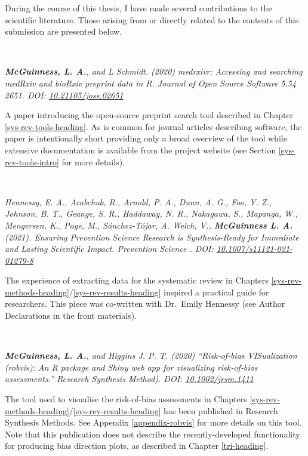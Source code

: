 \documentclass[a4paper, twoside]{templates/ociamthesis}
\begin{document}
During the course of this thesis, I have made several contributions to the scientific literature. Those arising from or directly related to the contents of this submission are presented below.

~

\emph{\textbf{McGuinness, L. A.}, and L Schmidt. (2020) medrxivr: Accessing and searching medRxiv and bioRxiv preprint data in R. Journal of Open Source Software 5.54 2651. DOI: \href{https://doi.org/10.21105/joss.02651}{10.21105/joss.02651}}

A paper introducing the open-source preprint search tool described in Chapter \ref{sys-rev-tools-heading}. As is common for journal articles describing software, the paper is intentionally short providing only a broad overview of the tool while extensive documentation is available from the project website (see Section \ref{sys-rev-tools-intro} for more details).

~

\emph{Hennessy, E. A., Acabchuk, R., Arnold, P. A., Dunn, A. G., Foo, Y. Z., Johnson, B. T., Geange, S. R., Haddaway, N. R., Nakagawa, S., Mapanga, W., Mengersen, K., Page, M., Sánchez-Tójar, A. Welch, V., \textbf{McGuinness L. A.} (2021). Ensuring Prevention Science Research is Synthesis-Ready for Immediate and Lasting Scientific Impact. Prevention Science . DOI: \href{https://doi.org/10.1007/s11121-021-01279-8}{10.1007/s11121-021-01279-8}}

The experience of extracting data for the systematic review in Chapters \ref{sys-rev-methods-heading}/\ref{sys-rev-results-heading} inspired a practical guide for researchers. This piece was co-written with Dr.~Emily Hennessy (see Author Declarations in the front materials).

~

\emph{\textbf{McGuinness, L. A.}, and Higgins J. P. T. (2020) ``Risk‐of‐bias VISualization (robvis): An R package and Shiny web app for visualizing risk‐of‐bias assessments.'' Research Synthesis Method). DOI: \href{https://doi.org/10.1002/jrsm.1411}{10.1002/jrsm.1411}}

The tool used to visualise the risk-of-bias assessments in Chapters \ref{sys-rev-methods-heading}/\ref{sys-rev-results-heading} has been published in Research Synthesis Methods. See Appendix \ref{appendix-robvis} for more details on this tool. Note that this publication does not describe the recently-developed functionality for producing bias direction plots, as described in Chapter \ref{tri-heading}.
\end{document}
